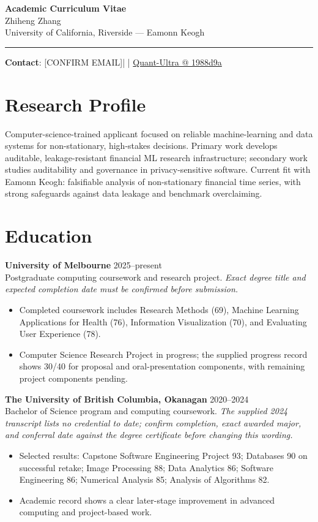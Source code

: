 \documentclass[11pt]{article}
\makeatletter
\newcommand{\ApplicantName}{Zhiheng Zhang}
\newcommand{\ApplicantEmail}{[CONFIRM EMAIL]}
\newcommand{\ApplicantPhone}{[CONFIRM PHONE]}
\newcommand{\ApplicantGitHub}{\href{https://github.com/zhiheng-zhang-Mera/Quant-Ultra/tree/1988d9a8530da91a8158de864d098ea869098923}{Quant-Ultra @ 1988d9a}}
\makeatother
\begin{document}
\begin{center}
{\LARGE\bfseries Academic Curriculum Vitae}\\[0.25em]
{\large \ApplicantName}\\
University of California, Riverside --- Eamonn Keogh
\end{center}
\vspace{0.35em}\hrule\vspace{0.65em}

\textbf{Contact}: \ApplicantEmail\quad | \quad \ApplicantPhone\quad | \quad \ApplicantGitHub

\section*{Research Profile}
Computer-science-trained applicant focused on reliable machine-learning and data systems for non-stationary, high-stakes decisions. Primary work develops auditable, leakage-resistant financial ML research infrastructure; secondary work studies auditability and governance in privacy-sensitive software. Current fit with Eamonn Keogh: falsifiable analysis of non-stationary financial time series, with strong safeguards against data leakage and benchmark overclaiming.

\section*{Education}
\textbf{University of Melbourne} \hfill 2025--present\\
Postgraduate computing coursework and research project. \textit{Exact degree title and expected completion date must be confirmed before submission.}
\begin{itemize}
\item Completed coursework includes Research Methods (69), Machine Learning Applications for Health (76), Information Visualization (70), and Evaluating User Experience (78).
\item Computer Science Research Project in progress; the supplied progress record shows 30/40 for proposal and oral-presentation components, with remaining project components pending.
\end{itemize}

\textbf{The University of British Columbia, Okanagan} \hfill 2020--2024\\
Bachelor of Science program and computing coursework. \textit{The supplied 2024 transcript lists no credential to date; confirm completion, exact awarded major, and conferral date against the degree certificate before changing this wording.}
\begin{itemize}
\item Selected results: Capstone Software Engineering Project 93; Databases 90 on successful retake; Image Processing 88; Data Analytics 86; Software Engineering 86; Numerical Analysis 85; Analysis of Algorithms 82.
\item Academic record shows a clear later-stage improvement in advanced computing and project-based work.
\end{itemize}
\end{document}
